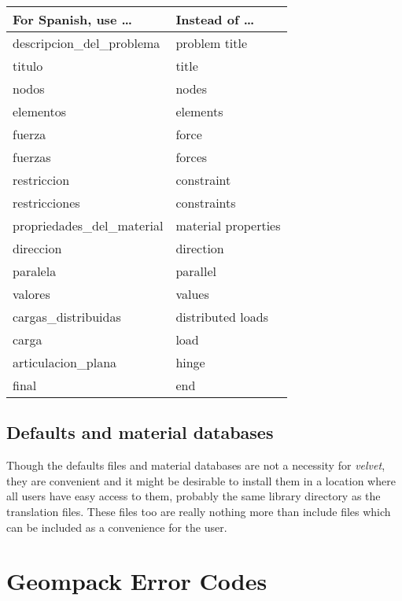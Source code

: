 \begin{appendix}
{\small
\begin{center}
\begin{tabular}{p{3in}p{3in}} \hline
\bf For Spanish, use \dots	& \bf Instead of \dots \\
\hline 
descripcion\_del\_problema 	& problem title \\
titulo 				& title \\
nodos 				& nodes \\
elementos 			& elements \\
fuerza 				& force \\
fuerzas				& forces \\
restriccion 			& constraint \\
restricciones 			& constraints \\
propriedades\_del\_material     & material properties \\
direccion 			& direction \\
paralela 			& parallel \\
valores 			& values \\
cargas\_distribuidas 		& distributed loads \\
carga 				& load \\
articulacion\_plana 		& hinge \\
final 				& end \\
\end{tabular}
\end{center}}

\section{Defaults and material databases}

Though the defaults files and material databases are not a necessity for 
{\em velvet}, they are convenient and it might be desirable to install them in 
a location where all users have easy access to them, probably the same
library directory as the translation files.  These files too are really
nothing more than include files which can be included as a convenience for
the user.


\newpage{\pagestyle{empty}\cleardoublepage}

\chapter{Geompack Error Codes}
\label{appendix.geompack}


\end{appendix}
